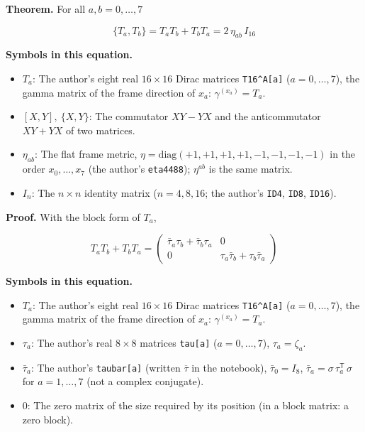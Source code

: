 \documentclass[
  10pt,
]{article}
\providecommand{\tightlist}{%
  \setlength{\itemsep}{0pt}\setlength{\parskip}{0pt}}
\begin{document}
\textbf{Theorem.} For all \(a, b = 0, \dots, 7\)

\[
\{T_a, T_b\} = T_aT_b + T_bT_a = 2\,\eta_{ab}\,I_{16}
\]

\textbf{Symbols in this equation.}

\begin{itemize}
\tightlist
\item
  \(T_a\): The author's eight real \(16 \times 16\) Dirac matrices
  \texttt{T16\^{}A{[}a{]}} (\(a = 0, \dots, 7\)), the gamma matrix of
  the frame direction of \(x_a\): \(\gamma^{(x_a)} = T_a\).
\item
  \([X, Y],\ \{X, Y\}\): The commutator \(XY - YX\) and the
  anticommutator \(XY + YX\) of two matrices.
\item
  \(\eta_{ab}\): The flat frame metric,
  \(\eta = \mathrm{diag}(+1, +1, +1, +1, -1, -1, -1, -1)\) in the order
  \(x_0, \dots, x_7\) (the author's \texttt{eta4488}); \(\eta^{ab}\) is
  the same matrix.
\item
  \(I_n\): The \(n \times n\) identity matrix (\(n = 4, 8, 16\); the
  author's \texttt{ID4}, \texttt{ID8}, \texttt{ID16}).
\end{itemize}

\textbf{Proof.} With the block form of \(T_a\),

\[
T_aT_b + T_bT_a = \begin{pmatrix} \bar\tau_a\tau_b + \bar\tau_b\tau_a & 0 \\ 0 & \tau_a\bar\tau_b + \tau_b\bar\tau_a \end{pmatrix}
\]

\textbf{Symbols in this equation.}

\begin{itemize}
\tightlist
\item
  \(T_a\): The author's eight real \(16 \times 16\) Dirac matrices
  \texttt{T16\^{}A{[}a{]}} (\(a = 0, \dots, 7\)), the gamma matrix of
  the frame direction of \(x_a\): \(\gamma^{(x_a)} = T_a\).
\item
  \(\tau_a\): The author's real \(8 \times 8\) matrices
  \texttt{tau{[}a{]}} (\(a = 0, \dots, 7\)), \(\tau_a = \zeta_a\).
\item
  \(\bar\tau_a\): The author's \texttt{taubar{[}a{]}} (written
  \(\overline{\tau}\) in the notebook), \(\bar\tau_0 = I_8\),
  \(\bar\tau_a = \sigma\,\tau_a^{\mathsf T}\,\sigma\) for
  \(a = 1, \dots, 7\) (not a complex conjugate).
\item
  \(0\): The zero matrix of the size required by its position (in a
  block matrix: a zero block).
\end{itemize}
\end{document}
